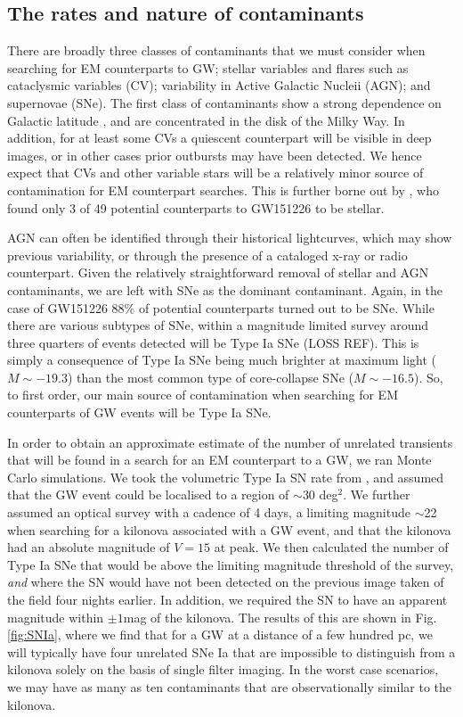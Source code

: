 \documentclass{aa}
\begin{document}
\subsection{The rates and nature of contaminants}

There are broadly three classes of contaminants that we must consider when searching for EM counterparts to GW; stellar variables and flares such as cataclysmic variables (CV); variability in Active Galactic Nucleii (AGN); and supernovae (SNe). The first class of contaminants show a strong dependence on Galactic latitude \citep{Drak14}, and are concentrated in the disk of the Milky Way. In addition, for at least some CVs a quiescent counterpart will be visible in deep images, or in other cases prior outbursts may have been detected. We hence expect that CVs and other variable stars will be a relatively minor source of contamination for EM counterpart searches. This is further borne out by \cite{Smar16}, who found only 3 of 49 potential counterparts to GW151226 to be stellar.

AGN can often be identified through their historical lightcurves, which may show previous variability, or through the presence of a cataloged x-ray or radio counterpart. Given the relatively straightforward removal of stellar and AGN contaminants, we are left with SNe as the dominant contaminant. Again, in the case of GW151226 88\% of potential counterparts turned out to be SNe. While there are various subtypes of SNe, within a magnitude limited survey around three quarters of events detected will be Type Ia SNe (LOSS REF). This is simply a consequence of Type Ia SNe being much brighter at maximum light ($M\sim -19.3$) than the most common type of core-collapse SNe ($M\sim -16.5$). So, to first order, our main source of contamination when searching for EM counterparts of GW events will be Type Ia SNe.

In order to obtain an approximate estimate of the number of unrelated transients that will be found in a search for an EM counterpart to a GW, we ran Monte Carlo simulations. We took the volumetric Type Ia SN rate from \cite{2010ApJ...713.1026D}, and assumed that the GW event could be localised to a region of $\sim$30 deg$^2$. We further assumed an optical survey with a cadence of 4 days, a limiting magnitude $\sim$22 when searching for a kilonova associated with a GW event, and that the kilonova had an absolute magnitude of $V=15$ at peak. We then calculated the number of Type Ia SNe that would be above the limiting magnitude threshold of the survey, {\it and} where the SN would have not been detected on the previous image taken of the field four nights earlier. In addition, we required the SN to have an apparent magnitude within $\pm1$mag of the kilonova. The results of this are shown in Fig. \ref{fig:SNIa}, where we find that for a GW at a distance of a few hundred pc, we will typically have four 
unrelated SNe Ia that are impossible to distinguish from a kilonova solely on the basis of single filter imaging. In the worst case scenarios, we may have as many as ten contaminants that are observationally similar to the kilonova.
\end{document}
